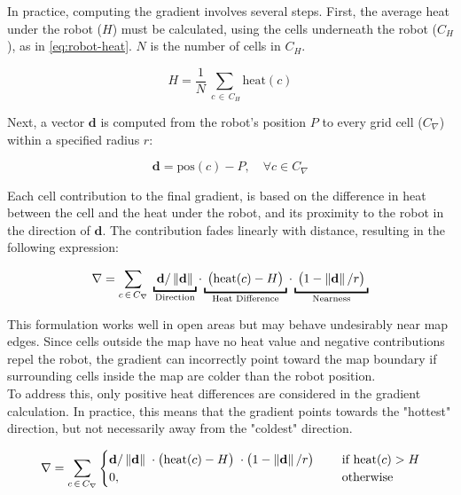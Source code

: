 In practice, computing the gradient involves several steps. First, the average heat under the robot ($H$) must be calculated, using the cells underneath the robot ($C_H$), as in \cref{eq:robot-heat}. $N$ is the number of cells in $C_H$.

\begin{equation}
\label{eq:robot-heat}
    H = \frac{1}{N} \sum_{\;c\,\in\,C_H} \mathrm{heat}(c)
\end{equation}

Next, a vector $\mathbf{d}$ is computed from the robot's position $P$ to every grid cell ($C_\nabla$) within a specified radius $r$:

\begin{equation}
    \mathbf{d} = \mathrm{pos}(c) - P, \quad \forall c \in C_\nabla
\end{equation}

Each cell contribution to the final gradient, is based on the difference in heat between the cell and the heat under the robot, and its proximity to the robot in the direction of $\mathbf{d}$. The contribution fades linearly with distance, resulting in the following expression:

\begin{equation}
    \nabla = \sum_{c\,\in\,C_\nabla} \;
    \underbracket{\; \mathbf{d}/\norm{\mathbf{d}}      \;}_\text{\makebox[0pt]{Direction}} \cdot
    \underbracket{\; \big(\mathrm{heat}(c) - H\big)    \;}_\text{Heat Difference} \cdot
    \underbracket{\; \big(1 - \norm{\mathbf{d}}/r\big) \;}_\text{Nearness}
    \label{eq:fade-gradient}
\end{equation}

This formulation works well in open areas but may behave undesirably near map edges. Since cells outside the map have no heat value and negative contributions repel the robot, the gradient can incorrectly point toward the map boundary if surrounding cells inside the map are colder than the robot position.  \\

To address this, only positive heat differences are considered in the gradient calculation. In practice, this means that the gradient points towards the "hottest" direction, but not necessarily away from the "coldest" direction.

\begin{equation}
\label{eq:robot-gradient}
    \nabla = \sum_{c\,\in\,C_\nabla}
    \begin{cases}
        \mathbf{d}/\left\lVert\mathbf{d}\right\rVert      \; \cdot
        \big(\mathrm{heat}(c) - H\big)    \; \cdot
        \big(1 - \left\lVert\mathbf{d}\right\rVert/r\big) \; \quad &\text{if } \mathrm{heat}(c) > H
        \\
        0, \quad &\text{otherwise}
    \end{cases}
\end{equation}

